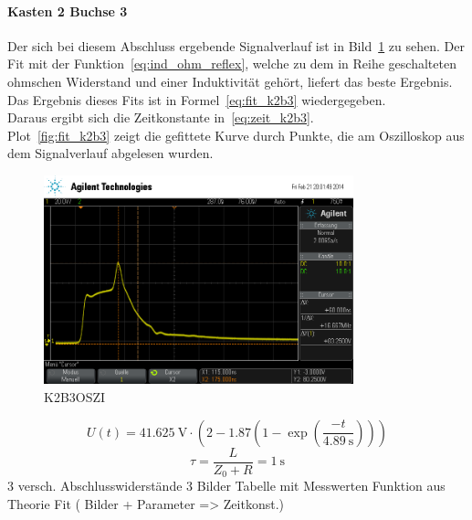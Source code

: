 \paragraph{Kasten 2 Buchse 3}
Der sich bei diesem Abschluss ergebende Signalverlauf ist in 
Bild~\ref{fig:k2b3} zu sehen. Der Fit mit der 
Funktion~\eqref{eq:ind_ohm_reflex}, welche zu dem in Reihe geschalteten 
ohmschen Widerstand und einer Induktivität gehört, liefert das 
beste Ergebnis. Das Ergebnis dieses Fits ist in 
Formel~\eqref{eq:fit_k2b3} wiedergegeben.\\
Daraus ergibt sich die Zeitkonstante in~\eqref{eq:zeit_k2b3}.\\
Plot~\ref{fig:fit_k2b3} zeigt die gefittete Kurve durch Punkte, die 
am Oszilloskop aus dem Signalverlauf abgelesen wurden.\\
%
\begin{figure}[]
\centering
\includegraphics[width=0.8\textwidth]{k2b3.png}
\caption{K2B3OSZI}
\label{fig:k2b3}
\end{figure}
%
\begin{equation}
U(t) = \SI{41.625}{\volt}\cdot\left(2 - 
1.87\left(1-\exp{\left(\frac{-t}{\SI{4.89}{\second}}\right)}
\right)\right)
\end{equation}
%
\begin{equation}
\tau = \frac{L}{Z_0 + R} = \SI{1}{\second}
\end{equation}
%
3 versch. Abschlusswiderstände 
3 Bilder
Tabelle mit Messwerten
Funktion aus Theorie
Fit ( Bilder + Parameter => Zeitkonst.)
%
